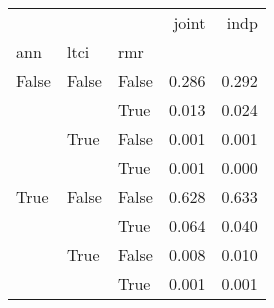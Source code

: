 \begin{tabular}{lllrr}
\toprule
     &      &      &  joint &   indp \\
ann & ltci & rmr &        &        \\
\midrule
False & False & False &  0.286 &  0.292 \\
     &      & True &  0.013 &  0.024 \\
     & True & False &  0.001 &  0.001 \\
     &      & True &  0.001 &  0.000 \\
True & False & False &  0.628 &  0.633 \\
     &      & True &  0.064 &  0.040 \\
     & True & False &  0.008 &  0.010 \\
     &      & True &  0.001 &  0.001 \\
\bottomrule
\end{tabular}
